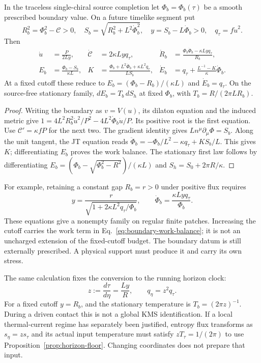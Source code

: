 \begin{proposition}
\label{prop:boundary-energy-work}
In the traceless single-chiral source completion let
$\Phi_b=\Phi_b(\tau)$ be a smooth prescribed boundary value. On a future
timelike segment put
\[
 R_b^2=\Phi_b^2-\mathcal C>0,\quad
 S_b=\sqrt{R_b^2+L^2\dot\Phi_b^2},\quad
 y=S_b-L\dot\Phi_b>0,\quad q_\tau=f\dot u^2.
\]
Then
\begin{align}
 \dot u&=\frac{P}{2Ly},&
 \dot{\mathcal C}&=2\kappa Lyq_\tau,&
 \dot R_b&=\frac{\Phi_b\dot\Phi_b-\kappa Lyq_\tau}{R_b},\nonumber\\
 E_b&=\frac{\Phi_b-S_b}{\kappa L},&
 K&=\frac{\Phi_b+L^2\ddot\Phi_b+\kappa L^2q_\tau}{LS_b},&
 \dot E_b&=q_\tau+\frac{L^{-1}-K}{\kappa}\dot\Phi_b .
 \label{eq:boundary-work-balance}
\end{align}
At a fixed cutoff these reduce to
$E_b=(\Phi_b-R_b)/(\kappa L)$ and $\dot E_b=q_\tau$.
On the source-free stationary family,
$dE_b=T_b\,dS_h$ at fixed $\Phi_b$, with
$T_b=R/(2\pi LR_b)$.
\end{proposition}
\begin{proof}
Writing the boundary as $v=V(u)$, its dilaton equation and the induced
metric give
$1=4L^2R_b^2\dot u^2/P^2-4L^2\dot\Phi_b\dot u/P$.
Its positive root is the first equation.
Use $\mathcal C'=\kappa fP$ for the next two.
The gradient identity gives $Ln^\mu\partial_\mu\Phi=S_b$.
Along the unit tangent, the JT equation reads
$\ddot\Phi_b=-\Phi_b/L^2-\kappa q_\tau+K S_b/L$.
This gives $K$; differentiating $E_b$ proves the work balance.
The stationary first law follows by differentiating
$E_b=(\Phi_b-\sqrt{\Phi_b^2-R^2})/(\kappa L)$ and
$S_h=S_0+2\pi R/\kappa$.
\end{proof}

For example, retaining a constant gap $R_b=r>0$ under positive flux requires
\[
 y=\frac r{\sqrt{1+2\kappa L^2q_\tau/\Phi_b}},\qquad
 \dot\Phi_b=\frac{\kappa Lyq_\tau}{\Phi_b}.
\]
These equations give a nonempty family on regular finite patches.
Increasing the cutoff carries the work term in
Eq.~\eqref{eq:boundary-work-balance}; it is not an uncharged extension of the
fixed-cutoff budget. The boundary datum is still externally prescribed.
A physical support must produce it and carry its own stress.

The same calculation fixes the conversion to the running horizon clock:
\begin{equation}\label{eq:boundary-clock-conversion}
 z:=\frac{d\tau}{d\eta}=\frac{Ly}{R},\qquad
 q_\eta=z^2q_\tau .
\end{equation}
For a fixed cutoff $y=R_b$, and the stationary temperature is
$T_b=(2\pi z)^{-1}$. During a driven contact this is not a global KMS
identification. If a local thermal-current regime has separately been
justified, entropy flux transforms as $s_\eta=z s_\tau$ and its actual
input temperature must satisfy $zT_\tau=1/(2\pi)$ to use
Proposition~\ref{prop:horizon-floor}. Changing coordinates does not prepare
that input.

